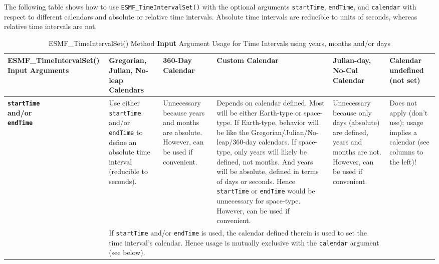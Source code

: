 The following table shows how to use {\tt ESMF\_TimeIntervalSet()} with the optional arguments {\tt startTime}, {\tt endTime}, and {\tt calendar} with respect to different calendars and absolute or relative time intervals.  Absolute time intervals are reducible to units of seconds, whereas relative time intervals are not.
\begin{center}
\begin{table}

\caption{\label{table:timeIntervalSet}ESMF\_TimeIntervalSet() Method {\bf Input} Argument Usage for Time Intervals using years, months and/or days}

\begin{tabular}{|p{1.5in}|p{1.25in}|p{1.25in}|p{1.25in}|p{1.25in}|p{1.25in}|}
\hline

{\bf ESMF\_TimeIntervalSet() Input Arguments} &
  {\bf Gregorian, Julian, No-leap Calendars} &
  {\bf 360-Day Calendar} &
  {\bf Custom Calendar} &
  {\bf Julian-day, No-Cal Calendar} &
  {\bf Calendar undefined} (not set) \\
\hline\hline

{\bf {\tt startTime} \newline
     and/or \newline
     {\tt endTime}} &

  Use either {\tt startTime} and/or {\tt endTime} to define an absolute time interval (reducible to seconds). &

  Unnecessary because years and months are absolute.  However, can be used if convenient. &

  Depends on calendar defined.  Most will be either Earth-type or space-type.  If Earth-type, behavior will be like the Gregorian/Julian/No-leap/360-day calendars.  If space-type, only years will likely be defined, not months.  And years will be absolute, defined in terms of days or seconds.  Hence {\tt startTime} or {\tt endTime} would be unnecessary for space-type.  However, can be used if convenient. &

  Unnecessary because only days (absolute) are defined, years and months are not.  However, can be used if convenient. &

  Does not apply (don't use); usage implies a calendar (see columns to the left)! \\
\cline{2-5}

  & \multicolumn{4}{l}{If {\tt startTime} and/or {\tt endTime} is used, the calendar defined therein is used to set the time interval's calendar.  Hence usage is mutually exclusive with the {\tt calendar} argument (see below).} \\
\hline


\end{tabular}
\end{table}
\end{center}
